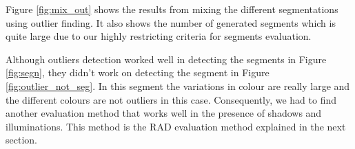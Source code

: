 \documentclass[twoside,11pt]{article}
\begin{document}
Figure \ref{fig:mix_out} shows the results from mixing the different
segmentations using outlier finding. It also shows the number of generated
segments which is quite large due to our highly restricting criteria for
segments evaluation.

Although outliers detection worked well in detecting the segments in Figure
\ref{fig:segn}, they didn't work on detecting the segment in Figure
\ref{fig:outlier_not_seg}. In this segment the variations in colour are
really large and the different colours are not outliers in this case. Consequently,
we had to find another evaluation method that works well in the presence of shadows
and illuminations. This method is the RAD evaluation method explained in the next
section.

\begin{figure}[!t]
\centering
{}\\
\end{figure}
\end{document}

